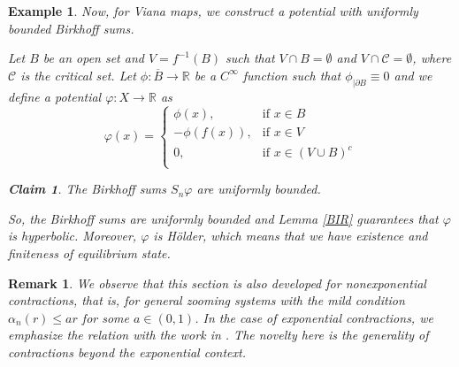 \documentclass[12pt,a4paper]{amsart}
\theoremstyle{plain}
\newtheorem{remark}{Remark}[subsection]
\newtheorem{example}{Example}[subsection]
\newtheorem{claim}{Claim}[subsection]
\begin{document}
\begin{example}
	Now, for Viana maps, we construct a potential with uniformly bounded Birkhoff sums. 
	
	Let $B$ be an open set and $V=f^{-1}(B)$ such that $V \cap B = \emptyset$ and $V \cap \mathcal{C} = \emptyset$, where $\mathcal{C}$ is the critical set. Let $\phi : \overline{B} \to \mathbb{R}$ be a $C^{\infty}$ function such that $\phi_{\mid \partial B} \equiv 0$ and we define a potential $\varphi : X \to \mathbb{R}$ as
	\[
	\varphi(x) =
	\left\{
	\begin{array}{cc}
		\phi(x), & \text{if} \,\, x  \in \displaystyle B \\
		-\phi(f(x)), &  \text{if} \,\, x \in V\\
		0, &  \text{if} \,\, x \in (V \cup B)^{c}\\    
	\end{array}
	\right.  
	\]
	\begin{claim}
		The Birkhoff sums $S_{n}\varphi$ are uniformly bounded.
	\end{claim}
%		
	
	So, the Birkhoff sums are uniformly bounded and Lemma \ref{BIR} guarantees that $\varphi$ is hyperbolic. Moreover, $\varphi$ is H\"older, which means that we have existence and finiteness of equilibrium state.
\end{example}

\begin{remark}
	We observe that this section is also developed for nonexponential contractions, that is, for general zooming systems with the mild condition $\alpha_{n}(r)\leq ar$ for some $a \in (0,1)$. In the case of exponential contractions, we emphasize the relation with the work in \cite{AOS}. The novelty here is the generality of contractions beyond the exponential context.
\end{remark}
\end{document}
